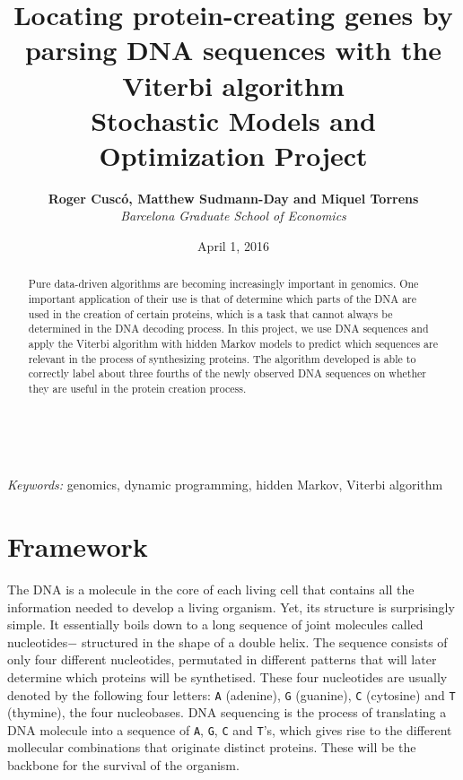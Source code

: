 \documentclass[a4paper, 11pt]{article} %
\title{\textbf{Locating protein-creating genes by parsing DNA sequences with the Viterbi algorithm}\\ %
\vspace{0.5cm}
{\Large Stochastic Models and Optimization Project}} %
\author{\textbf{Roger Cusc\'o, Matthew Sudmann-Day and Miquel Torrens} %
\vspace{0.1cm}
\\{{\large \textit{Barcelona Graduate School of Economics}}}} %
\date{\vspace{0.5cm} {\large April 1, 2016}} %
\makeatletter
\renewcommand{\maketitle}{ %
\begin{flushright} %
{\LARGE\@title} %

\vspace{50pt} %

{\large\@author} %
\\\@date %

\vspace{40pt} %
\end{flushright}
}
\makeatother
\begin{document}
\maketitle %



\begin{abstract}
Pure data-driven algorithms are becoming increasingly important in genomics. One important application of their use is that of determine which parts of the DNA are used in the creation of certain proteins, which is a task that cannot always be determined in the DNA decoding process. In this project, we use DNA sequences and apply the Viterbi algorithm with hidden Markov models to predict which sequences are relevant in the process of synthesizing proteins. The algorithm developed is able to correctly label about three fourths of the newly observed DNA sequences on whether they are useful in the protein creation process.
\end{abstract}

\hspace*{3,6mm}\textit{Keywords:} genomics, dynamic programming, hidden Markov, Viterbi algorithm %

\vspace{30pt} %


\section*{Framework}

The DNA is a molecule in the core of each living cell that contains all the information needed to develop a living organism. Yet, its structure is surprisingly simple. It essentially boils down to a long sequence of joint molecules \textendash called nucleotides$-$ structured in the shape of a double helix. The sequence consists of only four different nucleotides, permutated in different patterns that will later determine which proteins will be synthetised. These four nucleotides are usually denoted by the following four letters: \texttt{A} (adenine), \texttt{G} (guanine), \texttt{C} (cytosine) and \texttt{T} (thymine), the four nucleobases. DNA sequencing is the process of translating a DNA molecule into a sequence of \texttt{A}, \texttt{G}, \texttt{C} and \texttt{T}'s, which gives rise to the different mollecular combinations that originate distinct proteins. These will be the backbone for the survival of the organism.
\end{document}
